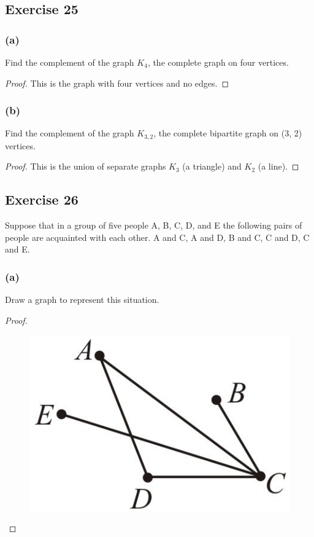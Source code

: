 \documentclass[14pt]{extarticle}
\begin{document}
\subsection{Exercise 25}
\subsubsection{(a)}
Find the complement of the graph \(K_4\), the complete graph on four vertices.

\begin{proof}
This is the graph with four vertices and no edges.
\end{proof}

\subsubsection{(b)}
Find the complement of the graph \(K_{3,2}\), the complete bipartite graph on (3, 2) vertices.

\begin{proof}
This is the union of separate graphs \(K_3\) (a triangle) and \(K_2\) (a line).
\end{proof}

\subsection{Exercise 26}
Suppose that in a group of five people A, B, C, D, and E the following pairs of people are acquainted with each other. A 
and C, A and D, B and C, C and D, C and E.

\subsubsection{(a)}
Draw a graph to represent this situation.

\begin{proof}
\begin{figure}[ht!]
\centering
\includegraphics[scale=0.15]{../images/10.1.26.a.png}
\end{figure}
\end{proof}
\end{document}
